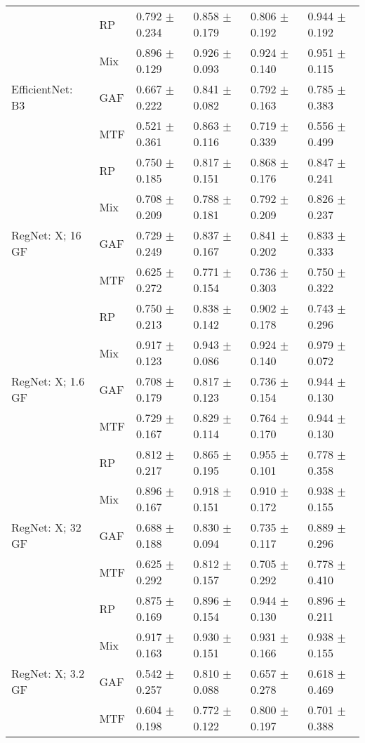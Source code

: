 \begin{longtable}[t]{llllll}
 & RP & 0.792 $\pm$ 0.234 & 0.858 $\pm$ 0.179 & 0.806 $\pm$ 0.192 & 0.944 $\pm$ 0.192 \\
 & Mix & 0.896 $\pm$ 0.129 & 0.926 $\pm$ 0.093 & 0.924 $\pm$ 0.140 & 0.951 $\pm$ 0.115 \\
EfficientNet: B3 & GAF & 0.667 $\pm$ 0.222 & 0.841 $\pm$ 0.082 & 0.792 $\pm$ 0.163 & 0.785 $\pm$ 0.383 \\
 & MTF & 0.521 $\pm$ 0.361 & 0.863 $\pm$ 0.116 & 0.719 $\pm$ 0.339 & 0.556 $\pm$ 0.499 \\
 & RP & 0.750 $\pm$ 0.185 & 0.817 $\pm$ 0.151 & 0.868 $\pm$ 0.176 & 0.847 $\pm$ 0.241 \\
 & Mix & 0.708 $\pm$ 0.209 & 0.788 $\pm$ 0.181 & 0.792 $\pm$ 0.209 & 0.826 $\pm$ 0.237 \\
RegNet: X; 16 GF & GAF & 0.729 $\pm$ 0.249 & 0.837 $\pm$ 0.167 & 0.841 $\pm$ 0.202 & 0.833 $\pm$ 0.333 \\
 & MTF & 0.625 $\pm$ 0.272 & 0.771 $\pm$ 0.154 & 0.736 $\pm$ 0.303 & 0.750 $\pm$ 0.322 \\
 & RP & 0.750 $\pm$ 0.213 & 0.838 $\pm$ 0.142 & 0.902 $\pm$ 0.178 & 0.743 $\pm$ 0.296 \\
 & Mix & 0.917 $\pm$ 0.123 & 0.943 $\pm$ 0.086 & 0.924 $\pm$ 0.140 & 0.979 $\pm$ 0.072 \\
RegNet: X; 1.6 GF & GAF & 0.708 $\pm$ 0.179 & 0.817 $\pm$ 0.123 & 0.736 $\pm$ 0.154 & 0.944 $\pm$ 0.130 \\
 & MTF & 0.729 $\pm$ 0.167 & 0.829 $\pm$ 0.114 & 0.764 $\pm$ 0.170 & 0.944 $\pm$ 0.130 \\
 & RP & 0.812 $\pm$ 0.217 & 0.865 $\pm$ 0.195 & 0.955 $\pm$ 0.101 & 0.778 $\pm$ 0.358 \\
 & Mix & 0.896 $\pm$ 0.167 & 0.918 $\pm$ 0.151 & 0.910 $\pm$ 0.172 & 0.938 $\pm$ 0.155 \\
RegNet: X; 32 GF & GAF & 0.688 $\pm$ 0.188 & 0.830 $\pm$ 0.094 & 0.735 $\pm$ 0.117 & 0.889 $\pm$ 0.296 \\
 & MTF & 0.625 $\pm$ 0.292 & 0.812 $\pm$ 0.157 & 0.705 $\pm$ 0.292 & 0.778 $\pm$ 0.410 \\
 & RP & 0.875 $\pm$ 0.169 & 0.896 $\pm$ 0.154 & 0.944 $\pm$ 0.130 & 0.896 $\pm$ 0.211 \\
 & Mix & 0.917 $\pm$ 0.163 & 0.930 $\pm$ 0.151 & 0.931 $\pm$ 0.166 & 0.938 $\pm$ 0.155 \\
RegNet: X; 3.2 GF & GAF & 0.542 $\pm$ 0.257 & 0.810 $\pm$ 0.088 & 0.657 $\pm$ 0.278 & 0.618 $\pm$ 0.469 \\
 & MTF & 0.604 $\pm$ 0.198 & 0.772 $\pm$ 0.122 & 0.800 $\pm$ 0.197 & 0.701 $\pm$ 0.388 \\

\end{longtable}
